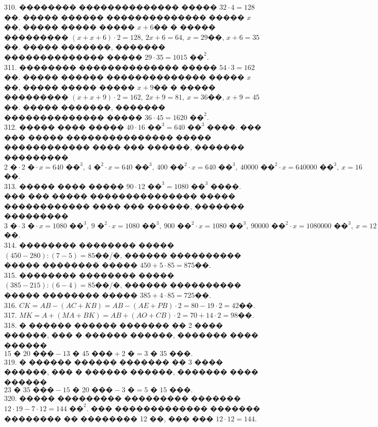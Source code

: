 \documentclass[12pt]{article}
\begin{document}
310. �������� �������������� ����� $32\cdot4=128$��. ����� ������ �������������� ����� $x$��, ����� ����� ����� $x+6$�� � ����� ��������� $(x+x+6)\cdot2=128,\ 2x+6=64,\ x=29$��, $x+6=35$��. ����� �������, ������� �������������� ����� $29\cdot35=1015\text{ ��}^2.$\\
311. �������� �������������� ����� $54\cdot3=162$��. ����� ������ �������������� ����� $x$��, ����� ����� ����� $x+9$�� � ����� ��������� $(x+x+9)\cdot2=162,\ 2x+9=81,\ x=36$��, $x+9=45$��. ����� �������, ������� �������������� ����� $36\cdot45=1620\text{ ��}^2.$\\
312. ����� ���� ����� $40\cdot16\text{ ��}^3=640\text{ ��}^3$ ����. ��� ��� ����� ��������������� ����� ������������ ���� ��� ������, ������� ��������� $2\text{ �}\cdot2\text{ �}\cdot x=640\text{ ��}^3,\ 4\text{ �}^2\cdot x=640\text { ��}^3,\ 400\text{ ��}^2\cdot x=640\text { ��}^3,\
40000\text{ ��}^2\cdot x=640000\text { ��}^3,\ x=16$��.\\
313. ����� ���� ����� $90\cdot12\text{ ��}^3=1080\text{ ��}^3$ ����. ��� ��� ����� ��������������� ����� ������������ ���� ��� ������, ������� ��������� $3\text{ �}\cdot3\text{ �}\cdot x=1080\text{ ��}^3,\ 9\text{ �}^2\cdot x=1080\text { ��}^3,\ 900\text{ ��}^2\cdot x=1080\text { ��}^3,\
90000\text{ ��}^2\cdot x=1080000\text { ��}^3,\ x=12$��.\\
314. �������� �������� ����� $(450-280):(7-5)=85$��/�, ������ ���������� ����� �������� ����� $450+5\cdot85=875$��.\\
315. �������� �������� ����� $(385-215):(6-4)=85$��/�, ������ ���������� ����� �������� ����� $385+4\cdot85=725$��.\\
316. $CK=AB-(AC+KB)=AB-(AE+PB)\cdot2=80-19\cdot2=42$��.\\
317. $MK=A+(MA+BK)=AB+(AO+CB)\cdot2=70+14\cdot2=98$��.\\
318. � ������ ������ ������� �� 2 ���� ������, ��� � ������ ������, ������� ���� ������\\ $15\text{ � }20\text{ ���}-13\text{ � }45\text{ ���}+2\text{ �}=3\text{ � }35\text{ ���}.$\\
319. � ������ ������ ������� �� 3 ���� ������, ��� � ������ ������, ������� ���� ������\\ $23\text{ � }35\text{ ���}-15\text{ � }20\text{ ���}-3\text{ �}=5\text{ � }15\text{ ���}.$\\
320. ����� ��������� ��������� ������� $12\cdot19-7\cdot12=144\text{ ��}^2.$ ��� ������������� ������� �������� �� �������� 12 ��, ��� ��� $12\cdot 12=144.$\\
\end{document}
